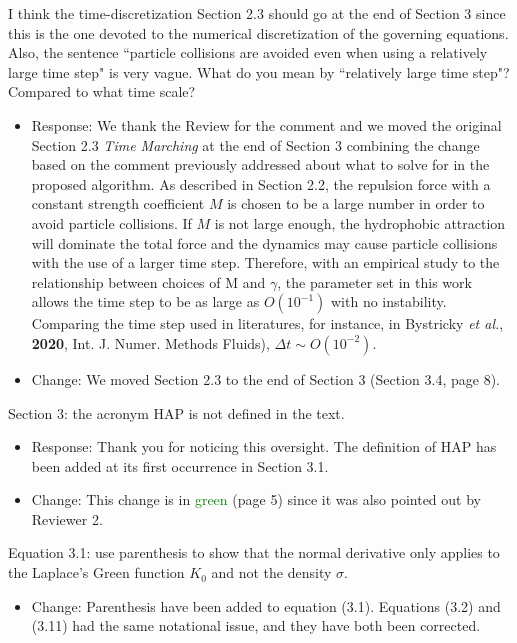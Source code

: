 \documentclass[11pt]{article}
\newcommand{\comment}[1]{{\color{blue} #1}}
\begin{document}
\noindent
\comment{I think the time-discretization Section 2.3 should go at the
end of Section 3 since this is the one devoted to the numerical
discretization of the governing equations. Also, the sentence ``particle
collisions are avoided even when using a relatively large time step" is
very vague.  What do you mean by ``relatively large time step"? Compared
to what time scale?}
\begin{itemize}
  \item Response: We thank the Review for the comment and we moved the original Section 2.3 {\it Time Marching} at the end of Section 3 combining the change based on the comment previously addressed about what to solve for in the proposed algorithm. 
As described in Section 2.2, the repulsion force with a constant strength coefficient $M$ is chosen 
to be a large number in order to avoid particle collisions. If $M$ is not large enough, the hydrophobic attraction will dominate the total force and the dynamics may cause particle collisions with the use of a larger time step. Therefore, with an empirical study to the relationship between 
choices of M and $\gamma$, the parameter set in this work allows the time step to be as large as
$O(10^{-1})$ with no instability. Comparing the time step used in literatures, for instance, in Bystricky {\sl et al.}, {\bf 2020}, Int. J. Numer. Methods Fluids), $\Delta t\sim O(10^{-2})$.
\item Change: We moved Section 2.3 to the end of Section 3 (Section 3.4, page 8).
\end{itemize}

\noindent
\comment{Section 3: the acronym HAP is not defined in the text.}
\begin{itemize}
  \item Response: Thank you for noticing this oversight. The definition of HAP has
    been added at its first occurrence in Section 3.1. 
  \item Change: This change is in \textcolor{green}{green} (page 5) since it was also pointed
    out by Reviewer 2.
\end{itemize}

\noindent
\comment{Equation 3.1: use parenthesis to show that the normal
derivative only applies to the Laplace’s Green function $K_0$ and not
the density $\sigma$.}
\begin{itemize}
  \item Change: Parenthesis have been added to equation (3.1).  Equations (3.2) and (3.11) had the same notational issue, and
    they have both been corrected.
\end{itemize}
\end{document}
